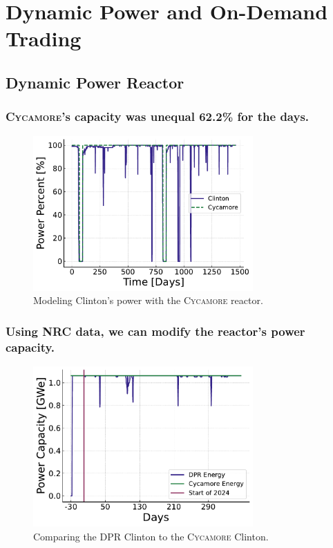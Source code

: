 \documentclass[9pt]{beamer}
\newcommand{\cycamore}{\textsc{Cycamore}\xspace}
\begin{document}
\section{Dynamic Power and On-Demand Trading}

\subsection{Dynamic Power Reactor}
\begin{frame}
  \frametitle{\cycamore's capacity was unequal 62.2\% for the days.}
  \begin{figure}
    \centering
    \includegraphics[width=0.75\textwidth]{images/power_percent_clinton_fake.pdf}
    \caption{Modeling Clinton's power with the \cycamore reactor.}
  \end{figure}
\end{frame}

\begin{frame}
  \frametitle{Using NRC data, we can modify the reactor's power capacity.}
  \begin{figure}
    \centering
    \includegraphics[width=0.75\textwidth]{images/dpr_cycamore_energy.pdf}
    \caption{Comparing the DPR Clinton to the \cycamore Clinton.}
  \end{figure}
\end{frame}
\end{document}
